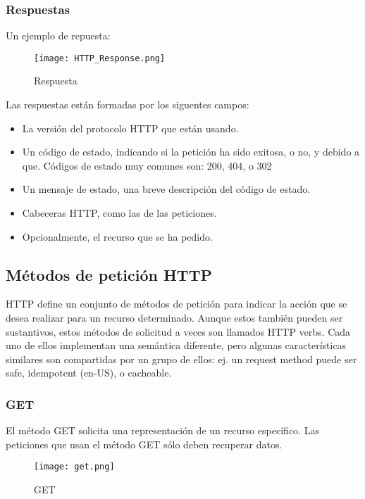 \subsubsection{Respuestas}
Un ejemplo de repuesta:
\begin{figure}[H]
	\center
	\texttt{[image: HTTP\_Response.png]}
	\caption{Respuesta}
	\label{fig:super}
\end{figure}
Las respuestas están formadas por los siguentes campos:

\begin{itemize}
	\item La versión del protocolo HTTP que están usando.
	\item Un código de estado, indicando si la petición ha sido exitosa, o no, y debido a que. Códigos de estado muy comunes son:  200, 404, o 302
	\item Un mensaje de estado, una breve descripción del código de estado. 
	\item Cabeceras HTTP, como las de las peticiones.
	\item Opcionalmente, el recurso que se ha pedido.
\end{itemize}

\subsection{Métodos de petición HTTP}

HTTP define un conjunto de métodos de petición para indicar la acción que se desea realizar para un recurso determinado. Aunque estos también pueden ser sustantivos, estos métodos de solicitud a veces son llamados HTTP verbs. Cada uno de ellos implementan una semántica diferente, pero algunas características similares son compartidas por un grupo de ellos: ej. un request method puede ser safe, idempotent (en-US), o cacheable.

\subsubsection{GET}

El método GET  solicita una representación de un recurso específico. Las peticiones que usan el método GET sólo deben recuperar datos.

\begin{figure}[H]
	\center
	\texttt{[image: get.png]}
	\caption{GET}
	\label{fig:super}
\end{figure}

